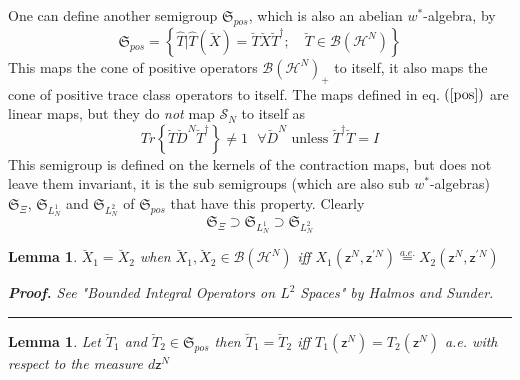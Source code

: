 \documentclass[aps,preprint]{revtex4}
\newtheorem{lemma}[theorem]{Lemma}
\newenvironment{proof}[1][Proof]{\noindent\textbf{#1.} }{\ \rule{0.5em}{0.5em}}
\begin{document}
One can define another semigroup $\mathfrak{S}_{pos}$, which is also an
abelian $w^{\ast }$-algebra, by 
\begin{equation}
\mathfrak{S}_{pos}=\left\{ \hat{T}|\hat{T}\left( \breve{X}\right) =\breve{T}%
\breve{X}\breve{T}^{\dagger };\quad \breve{T}\in \mathcal{B}\left( \mathcal{H%
}^{N}\right) \right\}  \label{pos}
\end{equation}%
This maps the cone of positive operators $\mathcal{B}\left( \mathcal{H}%
^{N}\right) _{+}$ to itself, it also maps the cone of positive trace class
operators to itself. The maps defined in eq. $\left( \ref{pos}\right) $ are
linear maps, but they do \emph{not }map $\mathcal{S}_{N}$ to itself as 
\begin{equation}
Tr\left\{ \breve{T}\breve{D}^{N}\breve{T}^{\dagger }\right\} \neq 1\text{ }%
\forall \breve{D}^{N}\text{ unless }\breve{T}^{\dagger }\breve{T}=I
\end{equation}%
This semigroup is defined on the kernels of the contraction maps, but does
not leave them invariant, it is the sub semigroups (which are also sub $%
w^{\ast }$-algebras) $\mathfrak{S}_{\Xi }$, $\mathfrak{S}_{L_{N}^{1}}$ and $%
\mathfrak{S}_{L_{N}^{2}}$ of $\mathfrak{S}_{pos}$ that have this property.
Clearly 
\begin{equation}
\mathfrak{S}_{\Xi }\supset \mathfrak{S}_{L_{N}^{1}}\supset \mathfrak{S}%
_{L_{N}^{2}}
\end{equation}

\begin{lemma}
\label{lemma1}$\breve{X}_{1}=\breve{X}_{2}$ when $\breve{X}_{1},\breve{X}%
_{2}\in \mathcal{B}\left( \mathcal{H}^{N}\right) $ iff $X_{1}\left( \mathsf{z%
}^{N},\mathsf{z}^{\prime N}\right) \overset{a.e.}{=}X_{2}\left( \mathsf{z}%
^{N},\mathsf{z}^{\prime N}\right) $

\begin{proof}
See "Bounded Integral Operators on $L^{2}$ Spaces" by Halmos and Sunder.
\end{proof}
\end{lemma}

\begin{lemma}
Let $\breve{T}_{1}$ and $\breve{T}_{2}\in \mathfrak{S}_{pos}$ then $\breve{T}%
_{1}=\breve{T}_{2}$ iff $T_{1}\left( \mathsf{z}^{N}\right) =T_{2}\left( 
\mathsf{z}^{N}\right) $ a.e. with respect to the measure $d\mathsf{z}^{N}$
\end{lemma}
\end{document}
